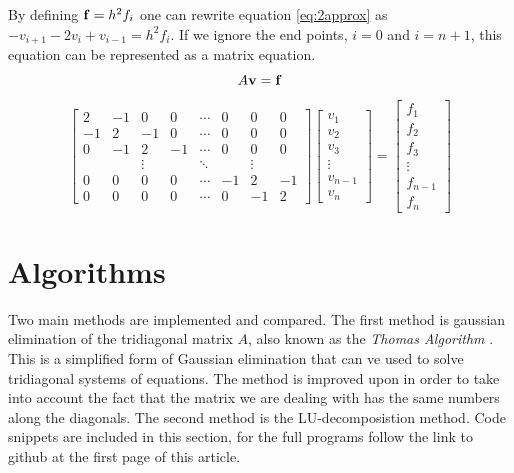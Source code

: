 \documentclass[10pt, a4paper]{amsart}
\begin{document}
By defining $\vb{f}=h^2f_i$ one can rewrite equation
\ref{eq:2approx} as $-v_{i+1}-2v_i+v_{i-1}=h^2f_i$. If we ignore the
end points, $i=0$ and $i=n+1$, this equation can be represented as a
matrix equation.
\begin{equation}
\label{eq:matrix}
A\vb{v}=\vb{f}
\end{equation}
\begin{equation}
\begin{bmatrix}
2 & -1 & 0 & 0 & \cdots & 0 & 0 & 0 \\
-1 & 2 & -1 & 0 & \cdots & 0 & 0 & 0 \\
0 & -1 & 2 & -1 & \cdots & 0 & 0 & 0 \\ 
& & \vdots &  & \ddots &  & \vdots & \\
0 & 0 & 0 & 0 & \cdots & -1 & 2 & -1 \\
0 & 0 & 0 & 0 & \cdots & 0 & -1 & 2 
\end{bmatrix}
\begin{bmatrix}
v_1 \\
v_2 \\
v_3 \\
\vdots \\
v_{n-1} \\
v_n
\end{bmatrix}=
\begin{bmatrix}
f_1 \\
f_2 \\
f_3 \\
\vdots \\
f_{n-1} \\
f_n
\end{bmatrix}
\end{equation}

\section{Algorithms}
Two main methods are implemented and compared. The first method is
gaussian elimination of the tridiagonal matrix $A$, also known as the
\emph{Thomas Algorithm} \cite{thomasalgo}. This is a simplified form of Gaussian
elimination that can ve used to solve tridiagonal systems of
equations. The method is improved upon in order to take into account
the fact that the matrix we are dealing with has the same numbers
along the diagonals. The second method is the LU-decomposistion
method. Code snippets are included in this section, for the full programs follow the link to github at the first page of this article.
\end{document}

